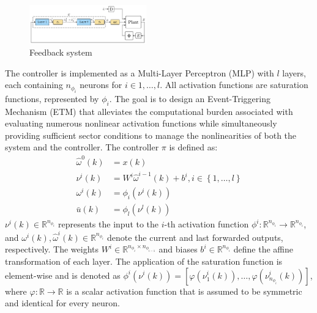 \documentclass{ifacconf}
\theoremstyle{plain}
\begin{document}
\begin{figure}[H]
    \centering
    \includegraphics[width=0.45\textwidth]{Figures/first_scheme}
    \caption{Feedback system}
    \label{fig:first_scheme}
\end{figure}
The controller is implemented as a Multi-Layer Perceptron (MLP) with $l$ layers, each containing $n_{\phi_i}$ neurons for $i \in {1, \dots, l}$. All activation functions are saturation functions, represented by $\phi_i$. The goal is to design an Event-Triggering Mechanism (ETM) that alleviates the computational burden associated with evaluating numerous nonlinear activation functions while simultaneously providing sufficient sector conditions to manage the nonlinearities of both the system and the controller. The controller $\pi$ is defined as:
\begin{equation}\label{eqn:nn-equations}
  \begin{aligned}
  \widehat{\omega}^{0}(k) &= x(k) \\
  \nu^{i}(k) &= W^{i} \widehat{\omega}^{i - 1}(k) + b^{i}, i \in \left\{ 1, \dots, l \right\}\\
  \omega^{i}(k) &= \phi_i(\nu^i(k))\\
  \bar{u}(k) &= \phi_l(\nu^l(k))
  \end{aligned} 
\end{equation}
$\nu^i(k) \in \mathbb{R}^{n_{\phi_i}}$ represents the input to the $i$-th activation function $\phi^i: \mathbb{R}^{n_{\phi_i}} \to \mathbb{R}^{n_{\phi_i}}$, and $\omega^i(k), \widehat{\omega}^i(k) \in \mathbb{R}^{n_{\phi_i}}$ denote the current and last forwarded outputs, respectively. The weights $W^i \in \mathbb{R}^{n_{\phi_i} \times n_{\phi_{i-1}}}$ and biases $b^i \in \mathbb{R}^{n_{\phi_i}}$ define the affine transformation of each layer. The application of the saturation function is element-wise and is denoted as $\phi^i(\nu^i(k)) = \left[ \varphi(\nu^i_1(k)), \dots, \varphi(\nu^i_{n_{\phi_i}}(k)) \right]$, where $\varphi: \mathbb{R} \to \mathbb{R}$ is a scalar activation function that is assumed to be symmetric and identical for every neuron.
\end{document}
